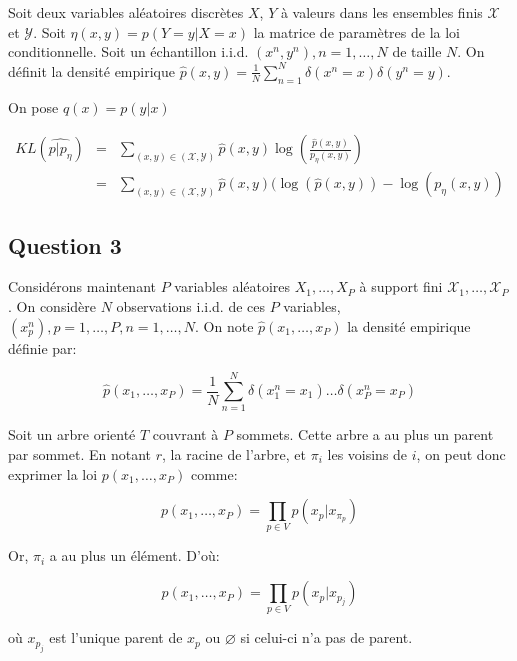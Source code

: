 \documentclass{article}
\begin{document}
Soit deux variables aléatoires discrètes $X$, $Y$ à valeurs dans les ensembles
finis $\mathcal{X}$ et $\mathcal{Y}$. Soit $\eta(x, y) = p(Y = y | X = x)$ la
matrice de paramètres de la loi conditionnelle. Soit un échantillon i.i.d.
$(x^n, y^n), n=1, \dots, N$ de taille $N$. On définit la densité empirique
$\hat{p}(x, y) = \frac{1}{N} \sum_{n=1}^N \delta(x^n = x) \delta(y^n = y)$.

On pose $q(x) = p(y | x)$

\begin{align}
KL(\hat{p | p_{\eta}} ) & = & \sum_{(x, y) \in (\mathcal{X}, \mathcal{Y})} \hat{p}(x, y) \log(\frac{\hat{p}(x, y)}{p_{\eta}(x, y)}) \\
			& = & \sum_{(x, y) \in (\mathcal{X}, \mathcal{Y})} \hat{p}(x, y) (\log(\hat{p}(x, y)) - \log(p_{\eta}(x, y))
\end{align}

\subsection{Question 3}

Considérons maintenant $P$ variables aléatoires $X_1, \dots, X_P$ à support
fini $\mathcal{X}_1, \dots, \mathcal{X}_P$. On considère $N$ observations
i.i.d. de ces $P$ variables, $(x_p^{n}), p = 1, \dots, P, n = 1, \dots, N$. On
note $\hat{p}(x_1, \dots, x_P)$ la densité empirique définie par:

\begin{equation}
\hat{p}(x_1, \dots, x_P) = \frac{1}{N} \sum_{n=1}^{N} \delta(x_1^n = x_1) \dots \delta(x_P^n = x_P)
\end{equation}

Soit un arbre orienté $T$ couvrant à $P$ sommets. Cette arbre a au plus un
parent par sommet. En notant $r$, la racine de l'arbre, et $\pi_i$ les voisins
de $i$, on peut donc exprimer la loi $p(x_1, \dots, x_P)$ comme:

\begin{equation}
p(x_1, \dots, x_P) = \prod_{p \in V} p(x_p | x_{\pi_p})
\end{equation}

Or, $\pi_i$ a au plus un élément. D'où:

\begin{equation}
p(x_1, \dots, x_P) = \prod_{p \in V}p(x_p | x_{p_j})
\end{equation}

où $x_{p_j}$ est l'unique parent de $x_p$ ou $\varnothing$ si celui-ci n'a pas
de parent.
\end{document}
